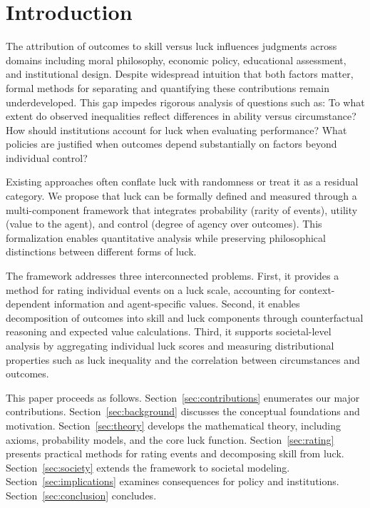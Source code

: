 \setcounter{tocdepth}{1}
\tableofcontents

\section{Introduction}

The attribution of outcomes to skill versus luck influences judgments across
domains including moral philosophy, economic policy, educational assessment,
and institutional design. Despite widespread intuition that both factors
matter, formal methods for separating and quantifying these
contributions remain underdeveloped. This gap impedes rigorous analysis of
questions such as: To what extent do observed inequalities reflect
differences in ability versus circumstance? How should institutions account
for luck when evaluating performance? What policies are justified when
outcomes depend substantially on factors beyond individual control?

Existing approaches often conflate luck with randomness or treat it as a
residual category. We propose that luck can be formally defined and measured
through a multi-component framework that integrates probability (rarity
of events), utility (value to the agent), and control (degree of agency
over outcomes). This formalization enables quantitative analysis while
preserving philosophical distinctions between different forms of luck.

The framework addresses three interconnected problems. First, it
provides a method for rating individual events on a luck scale, accounting
for context-dependent information and agent-specific values. Second, it enables
decomposition of outcomes into skill and luck components through counterfactual
reasoning and expected value calculations. Third, it supports societal-level
analysis by aggregating individual luck scores and measuring distributional
properties such as luck inequality and the correlation between circumstances
and outcomes.

This paper proceeds as follows. Section~\ref{sec:contributions}
enumerates our major contributions. Section~\ref{sec:background} discusses
the conceptual foundations and motivation. Section~\ref{sec:theory}
develops the mathematical theory, including axioms, probability models, and
the core luck function. Section~\ref{sec:rating} presents practical
methods for rating events and decomposing skill from luck. Section~\ref{sec:society}
extends the framework to societal modeling. Section~\ref{sec:implications}
examines consequences for policy and institutions. Section~\ref{sec:conclusion}
concludes.

